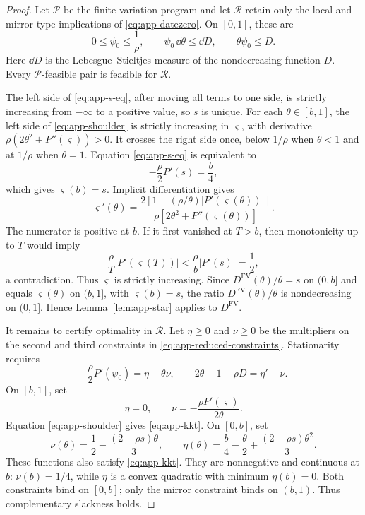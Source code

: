 \documentclass[12pt]{article}
\begin{document}
\begin{proof}
Let \(\mathcal P\) be the finite-variation program and let \(\mathcal R\)
retain only the local and mirror-type implications of
\eqref{eq:app-datezero}. On \([0,1]\), these are
\begin{equation}\label{eq:app-reduced-constraints}
  0\leq\psi_0\leq\frac1\rho,
  \qquad
  \psi_0\,\dd\theta\leq\dd D,
  \qquad
  \theta\psi_0\leq D.
\end{equation}
Here \(\dd D\) is the Lebesgue--Stieltjes measure of the nondecreasing
function \(D\). Every \(\mathcal P\)-feasible pair is feasible for
\(\mathcal R\).

The left side of \eqref{eq:app-s-eq}, after moving all terms to one side,
is strictly increasing from \(-\infty\) to a positive value, so \(s\) is
unique. For each \(\theta\in[b,1]\), the left side of
\eqref{eq:app-shoulder} is strictly increasing in \(\varsigma\), with
derivative \(\rho(2\theta^2+P''(\varsigma))>0\). It crosses the right side
once, below \(1/\rho\) when \(\theta<1\) and at \(1/\rho\) when
\(\theta=1\). Equation \eqref{eq:app-s-eq} is equivalent to
\[
  -\frac{\rho}{2}P'(s)=\frac b4,
\]
which gives \(\varsigma(b)=s\). Implicit differentiation gives
\begin{equation}\label{eq:app-shoulder-derivative}
  \varsigma'(\theta)
  =\frac{2[1-(\rho/\theta)|P'(\varsigma(\theta))|]}
  {\rho[2\theta^2+P''(\varsigma(\theta))]}.
\end{equation}
The numerator is positive at \(b\). If it first vanished at \(T>b\),
then monotonicity up to \(T\) would imply
\[
  \frac{\rho}{T}|P'(\varsigma(T))|
  <\frac{\rho}{b}|P'(s)|=\frac12,
\]
a contradiction. Thus \(\varsigma\) is strictly increasing. Since
\(D^{\mathrm{FV}}(\theta)/\theta=s\) on \((0,b]\) and equals
\(\varsigma(\theta)\) on \((b,1]\), with \(\varsigma(b)=s\), the ratio
\(D^{\mathrm{FV}}(\theta)/\theta\) is nondecreasing on \((0,1]\). Hence
Lemma~\ref{lem:app-star} applies to \(D^{\mathrm{FV}}\).

It remains to certify optimality in \(\mathcal R\). Let \(\eta\geq0\)
and \(\nu\geq0\) be the multipliers on the second and third constraints
in \eqref{eq:app-reduced-constraints}. Stationarity requires
\begin{equation}\label{eq:app-kkt}
  -\frac{\rho}{2}P'(\psi_0)=\eta+\theta\nu,
  \qquad
  2\theta-1-\rho D=\eta'-\nu.
\end{equation}
On \([b,1]\), set
\[
  \eta=0,
  \qquad
  \nu=-\frac{\rho P'(\varsigma)}{2\theta}.
\]
Equation \eqref{eq:app-shoulder} gives \eqref{eq:app-kkt}. On \([0,b]\),
set
\[
  \nu(\theta)=\frac12-\frac{(2-\rho s)\theta}{3},
  \qquad
  \eta(\theta)=\frac b4-\frac\theta2
    +\frac{(2-\rho s)\theta^2}{3}.
\]
These functions also satisfy \eqref{eq:app-kkt}. They are nonnegative and
continuous at \(b\): \(\nu(b)=1/4\), while \(\eta\) is a convex quadratic
with minimum \(\eta(b)=0\). Both constraints bind on \([0,b]\); only the
mirror constraint binds on \((b,1)\). Thus complementary slackness holds.


\end{proof}
\end{document}
